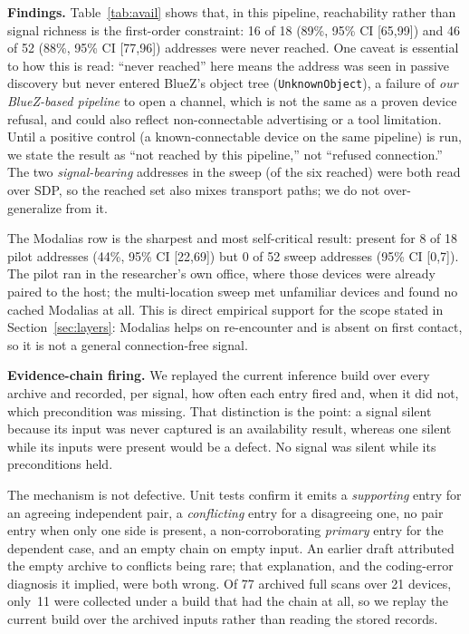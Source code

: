\documentclass[conference]{IEEEtran}
\begin{document}
\textbf{Findings.} Table~\ref{tab:avail} shows that, in this pipeline,
reachability rather than signal richness is the first-order constraint:
16 of 18 (89\%, 95\% CI [65,99]) and 46 of 52 (88\%, 95\% CI [77,96])
addresses were never reached. One caveat is essential to how this is
read: ``never reached'' here means the address was seen in passive
discovery but never entered BlueZ's object tree
(\texttt{UnknownObject}), a failure of \emph{our BlueZ-based pipeline}
to open a channel, which is not the same as a proven device refusal, and
could also reflect non-connectable advertising or a tool limitation.
Until a positive control (a known-connectable device on the same
pipeline) is run, we state the result as ``not reached by this
pipeline,'' not ``refused connection.'' The two \emph{signal-bearing}
addresses in the sweep (of the six reached) were both read over SDP, so
the reached set also mixes transport paths; we do not over-generalize
from it.

The Modalias row is the sharpest and most self-critical result: present
for 8 of 18 pilot addresses (44\%, 95\% CI [22,69]) but 0 of 52 sweep
addresses (95\% CI [0,7]). The pilot ran in the researcher's own office, where those devices
were already paired to the host; the multi-location sweep met unfamiliar
devices and found no cached Modalias at all. This is direct empirical
support for the scope stated in Section~\ref{sec:layers}: Modalias helps
on re-encounter and is absent on first contact, so it is not a general
connection-free signal.

\textbf{Evidence-chain firing.} We replayed the current inference build over
every archive and recorded, per signal, how often each entry fired and, when
it did not, which precondition was missing. That distinction is the point: a
signal silent because its input was never captured is an availability result,
whereas one silent while its inputs were present would be a defect. No signal
was silent while its preconditions held.

The mechanism is not defective. Unit tests confirm it emits a
\emph{supporting} entry for an agreeing independent pair, a
\emph{conflicting} entry for a disagreeing one, no pair entry when only one
side is present, a non-corroborating \emph{primary} entry for the dependent
case, and an empty chain on empty input. An earlier draft attributed the
empty archive to conflicts being rare; that explanation, and the coding-error
diagnosis it implied, were both wrong. Of 77 archived full scans over 21
devices, only~11 were collected under a build that had the chain at all, so
we replay the current build over the archived inputs rather than reading the
stored records.
\end{document}

